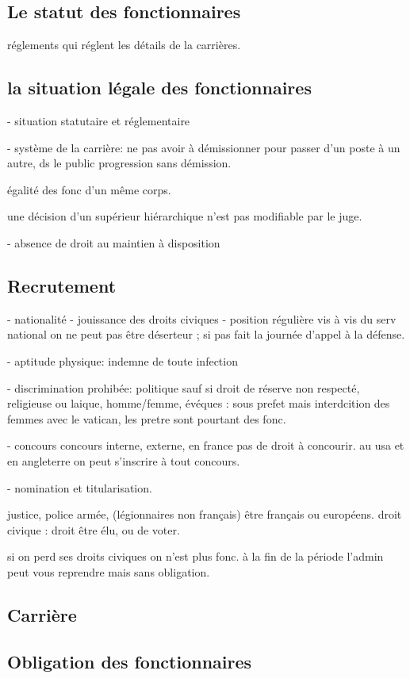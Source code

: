 \documentclass[a4paper,12pt]{article}
\begin{document}
\subsection{Le statut des fonctionnaires}
réglements qui réglent les détails de la carrières.
\subsection{la situation légale des fonctionnaires}

- situation statutaire et réglementaire

- système de la carrière:
ne pas avoir à démissionner pour passer d'un poste à un autre, ds le public progression sans démission.

égalité des fonc d'un même corps.

une décision d'un supérieur hiérarchique n'est pas modifiable par le juge.


- absence de droit au maintien à disposition


\subsection{Recrutement}

- nationalité
- jouissance des droits civiques
- position régulière vis à vis du serv national
on ne peut pas être déserteur ; si pas fait la journée d'appel à la défense.

- aptitude physique:
indemne de toute infection

- discrimination prohibée:
politique sauf si droit de réserve non respecté, religieuse ou laique, homme/femme,
évéques : sous prefet mais interdcition des femmes avec le vatican, les pretre sont pourtant des
fonc.


- concours
concours interne, externe, en france pas de droit à concourir.
au usa et en angleterre on peut s'inscrire à tout concours.

- nomination et titularisation.

justice, police armée, (légionnaires non français)
être français ou européens.
droit civique : droit être élu, ou de voter.

si on perd ses droits civiques on n'est plus fonc.
à la fin de la période l'admin peut vous reprendre mais sans obligation.

\subsection{Carrière}
\subsection{Obligation des fonctionnaires}
\end{document}
